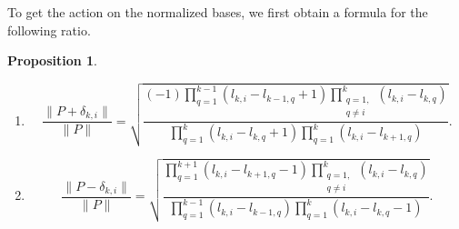 \documentclass{amsart}[12pt]
\newtheorem{proposition}[theorem]{Proposition}
\theoremstyle{definition}
\numberwithin{equation}{section}
\begin{document}
To get the action on the normalized bases, we first obtain a formula
for the following ratio.
\begin{proposition} \label{prop: ratio of lengths} \mbox{}
  \begin{enumerate}
    \item
  \[
    \frac{\|P + \delta_{k,i} \|}{\| P \|} = \sqrt{\frac{(-1)
    \displaystyle  \prod_{q=1}^{k-1}(l_{k,i}-l_{k-1,q}+1) \displaystyle\prod_{\substack{q=1,\\q\neq i}}^{k} (l_{k,i}-l_{k,q})}{\displaystyle\prod_{q=1}^{k}(l_{k,i}-l_{k,q}+1) \displaystyle\prod_{q=1}^{k} (l_{k,i}-l_{k+1,q})}}.
\]
\item
    \[
    \frac{\|P - \delta_{k,i} \|}{\| P \|} = \sqrt{\frac{
    \displaystyle  \prod_{q=1}^{k+1}(l_{k,i}-l_{k+1,q}-1) \displaystyle\prod_{\substack{q=1,\\q\neq i}}^{k} (l_{k,i}-l_{k,q})}{\displaystyle\prod_{q=1}^{k-1}(l_{k,i}-l_{k-1,q}) \displaystyle\prod_{q=1}^{k} (l_{k,i}-l_{k,q}-1)}}.
\]
\end{enumerate}
\end{proposition}
\end{document}
